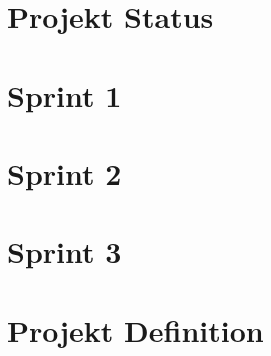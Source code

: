 \documentclass{hda/hdaConceptClass}
\begin{document}
\makesitHead


\newpage

\chapter{Projekt Status
}\label{chap:status}




\newpage

\chapter{Sprint 1
}\label{chap:kwxn}


\newpage 
\chapter{Sprint 2
}\label{chap:kwxn}



\newpage %
\chapter{Sprint 3
}\label{chap:kwxn}



\newpage
\chapter{Projekt Definition
}\label{chap:project}


\newpage


\newpage
\sitAppendix                 %
  \sitListOfTables
  \sitListOfFigures
  
\end{document}
